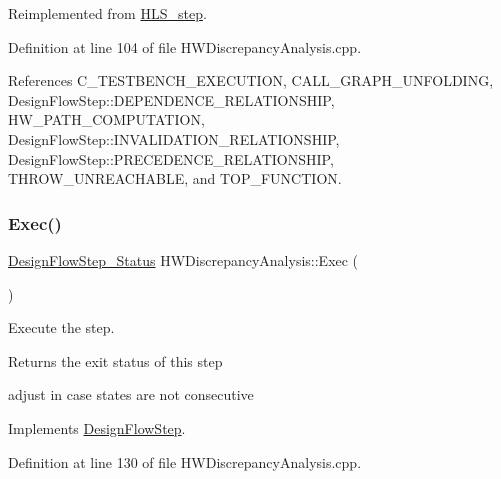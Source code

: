 Reimplemented from \hyperlink{classHLS__step_aed0ce8cca9a1ef18e705fc1032ad4de5}{H\+L\+S\+\_\+step}.



Definition at line 104 of file H\+W\+Discrepancy\+Analysis.\+cpp.



References C\+\_\+\+T\+E\+S\+T\+B\+E\+N\+C\+H\+\_\+\+E\+X\+E\+C\+U\+T\+I\+ON, C\+A\+L\+L\+\_\+\+G\+R\+A\+P\+H\+\_\+\+U\+N\+F\+O\+L\+D\+I\+NG, Design\+Flow\+Step\+::\+D\+E\+P\+E\+N\+D\+E\+N\+C\+E\+\_\+\+R\+E\+L\+A\+T\+I\+O\+N\+S\+H\+IP, H\+W\+\_\+\+P\+A\+T\+H\+\_\+\+C\+O\+M\+P\+U\+T\+A\+T\+I\+ON, Design\+Flow\+Step\+::\+I\+N\+V\+A\+L\+I\+D\+A\+T\+I\+O\+N\+\_\+\+R\+E\+L\+A\+T\+I\+O\+N\+S\+H\+IP, Design\+Flow\+Step\+::\+P\+R\+E\+C\+E\+D\+E\+N\+C\+E\+\_\+\+R\+E\+L\+A\+T\+I\+O\+N\+S\+H\+IP, T\+H\+R\+O\+W\+\_\+\+U\+N\+R\+E\+A\+C\+H\+A\+B\+LE, and T\+O\+P\+\_\+\+F\+U\+N\+C\+T\+I\+ON.

\mbox{\label{classHWDiscrepancyAnalysis_ab5f7d26b554925eb5a558fcfeaaf01d2}} 
\subsubsection{\texorpdfstring{Exec()}{Exec()}}
{\footnotesize\ttfamily \hyperlink{design__flow__step_8hpp_afb1f0d73069c26076b8d31dbc8ebecdf}{Design\+Flow\+Step\+\_\+\+Status} H\+W\+Discrepancy\+Analysis\+::\+Exec (\begin{DoxyParamCaption}{ }\end{DoxyParamCaption})\hspace{0.3cm}{\ttfamily [virtual]}}



Execute the step. 

\begin{DoxyReturn}{Returns}
the exit status of this step 
\end{DoxyReturn}
adjust in case states are not consecutive 

Implements \hyperlink{classDesignFlowStep_a77d7e38493016766098711ea24f60b89}{Design\+Flow\+Step}.



Definition at line 130 of file H\+W\+Discrepancy\+Analysis.\+cpp.




